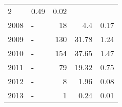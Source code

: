 \begin{longtable}{lXrrr}
       \num{2} &
       \num[round-mode=places,round-precision=2]{0,49} &
         \num[round-mode=places,round-precision=2]{0,02} \\

     2008 &
     \multicolumn{1}{X}{ -  } &


       \num{18} &
       \num[round-mode=places,round-precision=2]{4,4} &
         \num[round-mode=places,round-precision=2]{0,17} \\

     2009 &
     \multicolumn{1}{X}{ -  } &


       \num{130} &
       \num[round-mode=places,round-precision=2]{31,78} &
         \num[round-mode=places,round-precision=2]{1,24} \\

     2010 &
     \multicolumn{1}{X}{ -  } &


       \num{154} &
       \num[round-mode=places,round-precision=2]{37,65} &
         \num[round-mode=places,round-precision=2]{1,47} \\

     2011 &
     \multicolumn{1}{X}{ -  } &


       \num{79} &
       \num[round-mode=places,round-precision=2]{19,32} &
         \num[round-mode=places,round-precision=2]{0,75} \\

     2012 &
     \multicolumn{1}{X}{ -  } &


       \num{8} &
       \num[round-mode=places,round-precision=2]{1,96} &
         \num[round-mode=places,round-precision=2]{0,08} \\

     2013 &
     \multicolumn{1}{X}{ -  } &


       \num{1} &
       \num[round-mode=places,round-precision=2]{0,24} &
         \num[round-mode=places,round-precision=2]{0,01} \\


\end{longtable}
